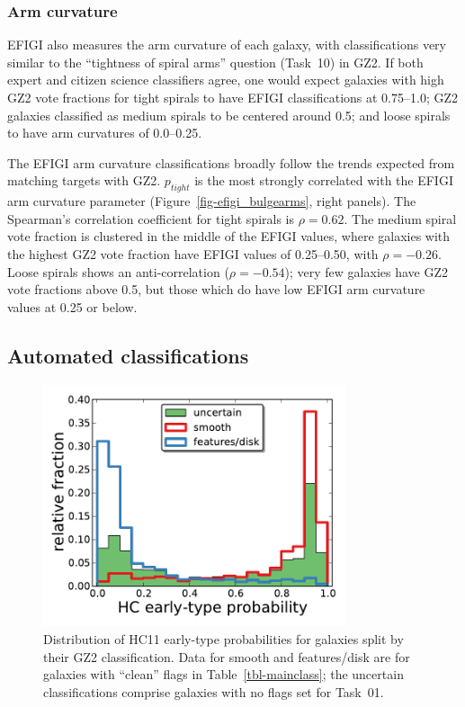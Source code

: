 \documentclass[useAMS,usenatbib]{mn2e}
\begin{document}
\subsubsection{Arm curvature}

EFIGI also measures the arm curvature of each galaxy, with classifications very similar to the ``tightness of spiral arms'' question (Task~10) in GZ2. If both expert and citizen science classifiers agree, one would expect galaxies with high GZ2 vote fractions for tight spirals to have EFIGI classifications at 0.75--1.0; GZ2 galaxies classified as medium spirals to be centered around 0.5; and loose spirals to have arm curvatures of 0.0--0.25. 

The EFIGI arm curvature classifications broadly follow the trends expected from matching targets with GZ2. $p_{tight}$ is the most strongly correlated with the EFIGI arm curvature parameter (Figure~\ref{fig-efigi_bulgearms}, right panels). The Spearman's correlation coefficient for tight spirals is $\rho=0.62$. The medium spiral vote fraction is clustered in the middle of the EFIGI values, where galaxies with the highest GZ2 vote fraction have EFIGI values of 0.25--0.50, with $\rho=-0.26$. Loose spirals shows an anti-correlation ($\rho=-0.54$); very few galaxies have GZ2 vote fractions above 0.5, but those which do have low EFIGI arm curvature values at 0.25 or below. 

\subsection{Automated classifications}

\begin{figure}
\includegraphics[angle=0,width=3.5in]{figures/hc_histogram.pdf}
\caption{Distribution of HC11 early-type probabilities for galaxies split by their GZ2 classification. Data for smooth and features/disk are for galaxies with ``clean'' flags in Table~\ref{tbl-mainclass}; the uncertain classifications comprise galaxies with no flags set for Task~01. 
\label{fig-hc_histogram}}
\end{figure}
\end{document}
